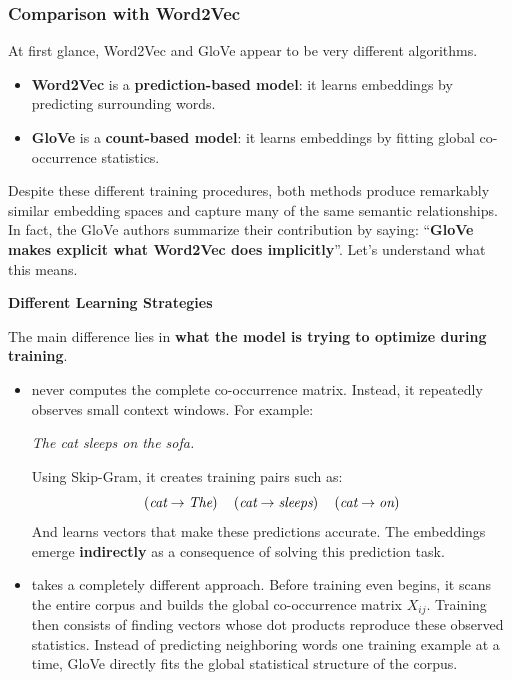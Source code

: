 \subsubsection{Comparison with Word2Vec}\label{sec:comparison-with-word2vec}

At first glance, Word2Vec and GloVe appear to be very different algorithms.
\begin{itemize}
    \item \textbf{Word2Vec} is a \textbf{prediction-based model}: it learns embeddings by predicting surrounding words.
    \item \textbf{GloVe} is a \textbf{count-based model}: it learns embeddings by fitting global co-occurrence statistics.
\end{itemize}
Despite these different training procedures, both methods produce remarkably similar embedding spaces and capture many of the same semantic relationships. In fact, the GloVe authors summarize their contribution by saying: ``\textbf{GloVe makes explicit what Word2Vec does implicitly}''.\cite{pennington2014glove} Let's understand what this means.

\highspace
\begin{flushleft}
    \textcolor{Green3}{ \textbf{Different Learning Strategies}}
\end{flushleft}
The main difference lies in \textbf{what the model is trying to optimize during training}.
\begin{itemize}
    \item {} never computes the complete co-occurrence matrix. Instead, it repeatedly observes small context windows. For example:
    \begin{center}
        \emph{The cat sleeps on the sofa.}
    \end{center}
    Using Skip-Gram, it creates training pairs such as:
    \begin{equation*}
        \left(\emph{cat} \to \emph{The}\right) \quad \left(\emph{cat} \to \emph{sleeps}\right) \quad \left(\emph{cat} \to \emph{on}\right)
    \end{equation*}
    And learns vectors that make these predictions accurate. The embeddings emerge \textbf{indirectly} as a consequence of solving this prediction task.

    \item {} takes a completely different approach. Before training even begins, it scans the entire corpus and builds the global co-occurrence matrix $X_{ij}$. Training then consists of finding vectors whose dot products reproduce these observed statistics. Instead of predicting neighboring words one training example at a time, GloVe directly fits the global statistical structure of the corpus.
\end{itemize}

